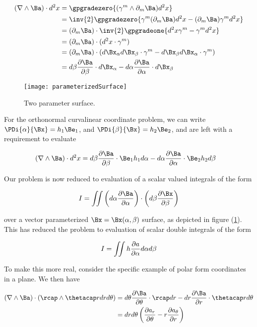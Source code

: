 \begin{align*}
(\grad \wedge \Ba) \cdot d^2 x
&=
\gpgradezero{ (\gamma^m \wedge \partial_m \Ba) d^2 x} \\
&=
\inv{2} \gpgradezero{ \gamma^m (\partial_m \Ba) d^2 x - (\partial_m \Ba) \gamma^m d^2 x} \\
&=
(\partial_m \Ba) \cdot \inv{2} \gpgradeone{ d^2 x \gamma^m - \gamma^m d^2 x} \\
&=
(\partial_m \Ba) \cdot ( d^2 x \cdot \gamma^m ) \\
&=
(\partial_m \Ba) \cdot ( d\Bx_\alpha d\Bx_\beta \cdot \gamma^m - d\Bx_\beta d\Bx_\alpha \cdot \gamma^m) \\
&=
d\beta \PD{\beta}{\Ba} \cdot d\Bx_\alpha -d\alpha \PD{\alpha}{\Ba} \cdot d\Bx_\beta 
\end{align*}

\begin{figure}[htp]
\centering
\texttt{[image: parameterizedSurface]}
\caption{Two parameter surface.}\label{fig:parameterizedSurface}
\end{figure}

For the orthonormal curvalinear coordinate problem, we can write $\PDi{\alpha}{\Bx} = h_1 \Be_1$, and $\PDi{\beta}{\Bx} = h_2 \Be_2$, and are left with a requirement to evaluate

\begin{align*}
(\grad \wedge \Ba) \cdot d^2 x
&=
d\beta \PD{\beta}{\Ba} \cdot \Be_1 h_1 d\alpha -d\alpha \PD{\alpha}{\Ba} \cdot \Be_2 h_2 d\beta
\end{align*}

Our problem is now reduced to evaluation of a scalar valued integrals of the form

\begin{align*}
I = \iint \left( d\alpha \PD{\alpha}{\Ba} \right) \cdot \left( d\beta \PD{\beta}{\Bx} \right)
\end{align*}

over a vector parameterized $\Bx = \Bx(\alpha, \beta)$ surface, as depicted in figure (\ref{fig:parameterizedSurface}).  This has reduced the problem to evaluation of scalar double integrals of the form

\begin{align*}
I = \iint h \frac{\partial {a}}{\partial {\alpha}} d\alpha d\beta 
\end{align*}

To make this more real, consider the specific example of polar form coordinates in a plane.  We then have

\begin{align*}
(\grad \wedge \Ba) \cdot (\rcap \wedge \thetacap r dr d\theta)
&=
d\theta \PD{\theta}{\Ba} \cdot \rcap dr -dr \PD{r}{\Ba} \cdot \thetacap r d\theta \\
&=
dr d\theta \left( \PD{\theta}{a_r} - r \PD{r}{a_\theta} \right)
\end{align*}

\EndNoBibArticle
